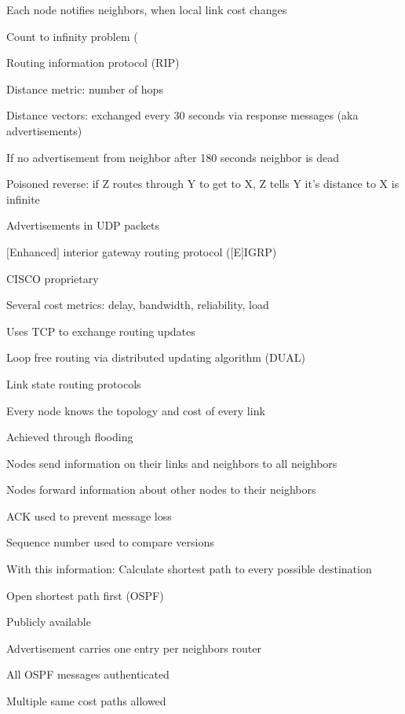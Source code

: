 				\item Each node notifies neighbors, when local link cost changes
			\enumend
			\item Count to infinity problem (
			\item Routing information protocol (RIP)
			\enumstart
				\item Distance metric: number of hops
				\item Distance vectors: exchanged every 30 seconds via response messages (aka advertisements)
				\item If no advertisement from neighbor after 180 seconds \arrow neighbor is dead
				\item Poisoned reverse: if Z routes through Y to get to X, Z tells Y it's distance to X is infinite
				\item Advertisements in UDP packets
			\enumend
			\item $[$Enhanced$]$ interior gateway routing protocol ($[$E$]$IGRP)
			\enumstart
				\item CISCO proprietary
				\item Several cost metrics: delay, bandwidth, reliability, load \ddd
				\item Uses TCP to exchange routing updates
				\item Loop free routing via distributed updating algorithm (DUAL)
			\enumend
		\enumend
		\item Link state routing protocols
		\enumstart
			\item Every node knows the topology and cost of every link
			\enumstart
				\item Achieved through flooding
				\item Nodes send information on their links and neighbors to all neighbors
				\item Nodes forward information about other nodes to their neighbors
				\item ACK used to prevent message loss
				\item Sequence number used to compare versions
			\enumend
			\item With this information: Calculate shortest path to every possible destination
			\item Open shortest path first (OSPF)
			\enumstart
				\item Publicly available
				\item Advertisement carries one entry per neighbors router
				\item All OSPF messages authenticated
				\item Multiple same cost paths allowed

